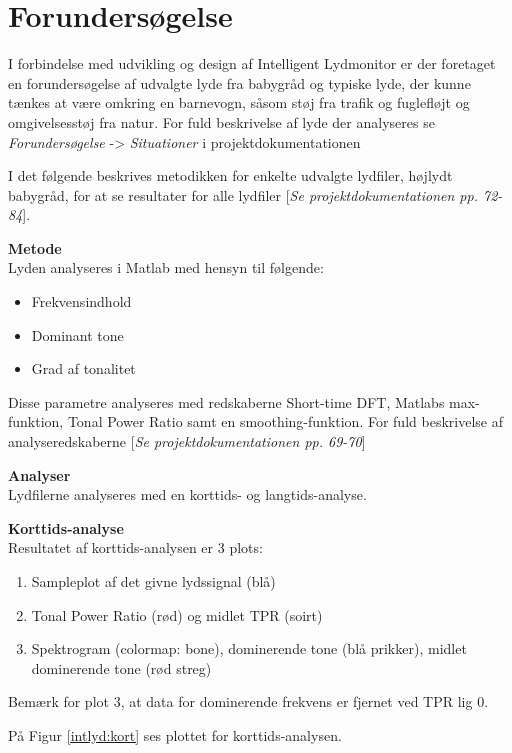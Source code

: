 \section{Forundersøgelse}
I forbindelse med udvikling og design af Intelligent Lydmonitor er der foretaget en forundersøgelse af udvalgte lyde fra babygråd og typiske lyde, der kunne tænkes at være omkring en barnevogn, såsom støj fra trafik og fuglefløjt og omgivelsesstøj fra natur. For fuld beskrivelse af lyde der analyseres se \textit{Forundersøgelse} -> \textit{Situationer} i projektdokumentationen 

I det følgende beskrives metodikken for enkelte udvalgte lydfiler, højlydt babygråd, for at se resultater for alle lydfiler [\textit{Se projektdokumentationen pp. 72-84}]. 

\textbf{Metode} \\
Lyden analyseres i Matlab med hensyn til følgende: 
\begin{itemize}
\item Frekvensindhold
\item Dominant tone
\item Grad af tonalitet
\end{itemize}

Disse parametre analyseres med redskaberne Short-time DFT, Matlabs max-funktion, Tonal Power Ratio samt en smoothing-funktion. For fuld beskrivelse af analyseredskaberne [\textit{Se projektdokumentationen pp. 69-70}]

\textbf{Analyser}\\
Lydfilerne analyseres med en korttids- og langtids-analyse. 

\textbf{Korttids-analyse}\\
Resultatet af korttids-analysen er 3 plots:
\begin{enumerate}
\item Sampleplot af det givne lydssignal (blå)
\item Tonal Power Ratio (rød) og midlet TPR (soirt)
\item Spektrogram (colormap: bone), dominerende tone (blå prikker), midlet dominerende tone (rød streg)
\end{enumerate}
Bemærk for plot 3, at data for dominerende frekvens er fjernet ved TPR lig 0.

På Figur \ref{intlyd:kort} ses plottet for korttids-analysen.



